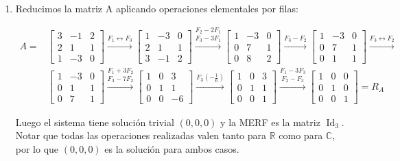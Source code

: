 \documentclass[a4paper,12pt,twoside,spanish,reqno]{amsbook}
\numberwithin{equation}{section}
\begin{document}
\begin{enumerate}
\begin{enumerate}
\item Reducimos la matriz A aplicando operaciones elementales por filas:

\begin{align*}
A = &\begin{bmatrix}3 & -1 & 2 \\2 & 1 & 1 \\1&-3&0\end{bmatrix}
\stackrel{F_1 \leftrightarrow F_3}{\longrightarrow}
\begin{bmatrix}1&-3&0\\2 & 1 & 1 \\3 & -1 & 2 \end{bmatrix}
\stackrel{F_2 - 2 F_1}{\stackrel{F_3 - 3 F_1}{\longrightarrow}}
\begin{bmatrix} 1 & -3 & 0 \\ 0 & 7 & 1 \\ 0 & 8 & 2 \end{bmatrix}
\stackrel{F_3-F_2}{\longrightarrow}
\begin{bmatrix} 1 & -3 & 0 \\ 0 & 7 & 1 \\ 0 & 1 & 1 \end{bmatrix}
\stackrel{F_3 \leftrightarrow F_2}{\longrightarrow} \\
&\begin{bmatrix} 1 & -3 & 0 \\ 0 & 1 & 1 \\ 0 & 7 & 1 \end{bmatrix}
\stackrel{F_1 + 3 F_2}{\stackrel{F_3-7F_2}{\longrightarrow}}
\begin{bmatrix} 1 & 0 & 3 \\ 0 & 1 & 1 \\ 0 & 0 & -6 \end{bmatrix}
\stackrel{F_3 (-\frac{1}{6}) }{\longrightarrow}
\begin{bmatrix} 1 & 0 & 3 \\ 0 & 1 & 1 \\ 0 & 0 & 1 \end{bmatrix}
\stackrel{F_1 - 3 F_3}{\stackrel{F_2 - F_3 }{\longrightarrow}}
\begin{bmatrix} 1 & 0 & 0 \\ 0 & 1 & 0 \\ 0 & 0 & 1 \end{bmatrix} = R_A
\end{align*}

Luego el sistema tiene solución trivial $(0,0,0)$ y la MERF es la matriz $\operatorname{Id}_3$. Notar que todas las operaciones realizadas valen tanto para $\mathbb{R}$ como para $\mathbb{C}$, por lo que $(0,0,0)$ es la solución para ambos casos.


\end{enumerate}
\end{enumerate}
\end{document}
